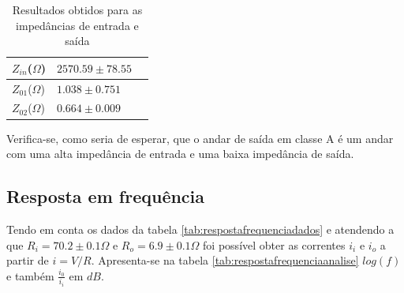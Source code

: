 \documentclass[%
  reprint,
  nofootinbib,
  amsmath,amssymb,
  aps,
  10pt,
  a4paper
]{revtex4-1}
\begin{document}
{\begin{table}[h]
    \begin{tabular}{|l|l|l|}
    \hline
    $Z_{in}$($\Omega$) & $2570.59 \pm 78.55$ \\ \hline
    $Z_{01}$($\Omega$) & $1.038\pm 0.751$  \\ \hline
    $Z_{02}$($\Omega$) & $0.664\pm0.009$  \\ \hline
    \end{tabular}
\caption{Resultados obtidos para as impedâncias de entrada e saída}
\label{tab:analiseimpedancias}
\end{table}

Verifica-se, como seria de esperar, que o andar de saída em classe A é um andar com uma alta impedância de entrada e uma baixa impedância de saída.


\subsection{Resposta em frequência}
Tendo em conta os dados da tabela \ref{tab:respostafrequenciadados} e atendendo a que $R_i=70.2 \pm 0.1\Omega$ e $R_o=6.9 \pm 0.1\Omega$ foi possível obter as correntes $i_i$ e $i_o$ a partir de $i=V/R$. Apresenta-se na tabela \ref{tab:respostafrequenciaanalise} $log(f)$ e também $\frac{i_0}{i_i}$ em $dB$. 


}
\end{document}
